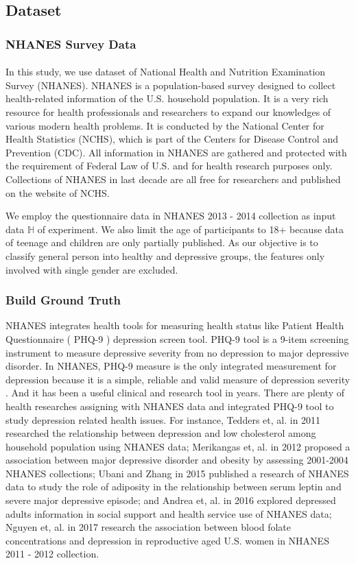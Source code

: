 \documentclass[10pt,journal,compsoc]{IEEEtran}
\begin{document}
\subsection{Dataset}
\subsubsection{NHANES Survey Data}
\paragraph{}
In this study, we use dataset of National Health and Nutrition Examination Survey (NHANES). NHANES is a population-based survey designed to collect health-related information of the U.S. household population. It is a very rich resource for health professionals and researchers to expand our knowledges of various modern health problems. It is conducted by the National Center for Health Statistics (NCHS), which is part of the Centers for Disease Control and Prevention (CDC). All information in NHANES are gathered and protected with the requirement of Federal Law of U.S. and for health research purposes only. Collections of NHANES in last decade are all free for researchers and published on the website of NCHS.

We employ the questionnaire data in NHANES 2013 - 2014 collection as input data $\mathbb{H}$ of experiment. We also limit the age of participants to 18+ because data of teenage and children are only partially published. As our objective is to classify general person into healthy and depressive groups, the features only involved with single gender are excluded.  

\subsubsection{Build Ground Truth}
NHANES integrates health tools for measuring health status like Patient Health Questionnaire ( PHQ-9 ) depression screen tool. PHQ-9 tool is a 9-item screening instrument to measure depressive severity from no depression to major depressive disorder. In NHANES, PHQ-9 measure is the only integrated measurement for depression because it is a simple, reliable and valid measure of depression severity \cite{Kroenke}. And it has been a useful clinical and research tool in years. There are plenty of health researches assigning with NHANES data and integrated PHQ-9 tool to study depression related health issues. For instance, Tedders et, al. \cite{Tedders} in 2011 researched the relationship between depression and low cholesterol among household population using NHANES data; Merikangas et, al. \cite{Merikangas} in 2012 proposed a association between major depressive disorder and obesity by assessing 2001-2004 NHANES collections; Ubani and Zhang \cite{Ubani} in 2015 published a research of NHANES data to study the role of adiposity in the relationship between serum leptin and severe major depressive episode; and Andrea et, al. \cite{Andrea} in 2016 explored depressed adults information in social support and health service use of NHANES data; Nguyen et, al. \cite{Nguyen} in 2017 research the association between blood folate concentrations and depression in reproductive aged U.S. women in NHANES 2011 - 2012 collection.
\end{document}
